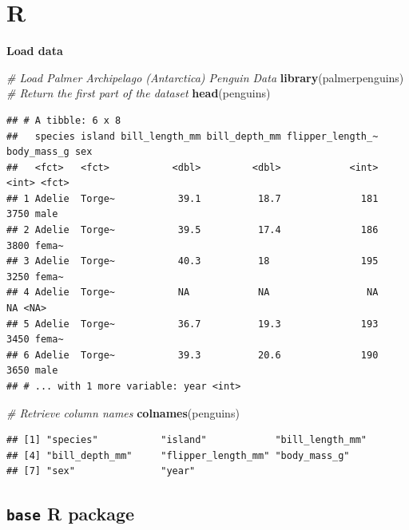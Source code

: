 \documentclass[]{book}
\newenvironment{Shaded}{\begin{snugshade}}{\end{snugshade}}
\newcommand{\CommentTok}[1]{\textcolor[rgb]{0.56,0.35,0.01}{\textit{#1}}}
\newcommand{\KeywordTok}[1]{\textcolor[rgb]{0.13,0.29,0.53}{\textbf{#1}}}
\newcommand{\NormalTok}[1]{#1}
\begin{document}
\hypertarget{r-4}{%
\section{R}\label{r-4}}

\textbf{Load data}

\begin{Shaded}
\begin{Highlighting}[]
\CommentTok{# Load Palmer Archipelago (Antarctica) Penguin Data}
\KeywordTok{library}\NormalTok{(palmerpenguins)}
\CommentTok{# Return the first part of the dataset}
\KeywordTok{head}\NormalTok{(penguins)}
\end{Highlighting}
\end{Shaded}

\begin{verbatim}
## # A tibble: 6 x 8
##   species island bill_length_mm bill_depth_mm flipper_length_~ body_mass_g sex  
##   <fct>   <fct>           <dbl>         <dbl>            <int>       <int> <fct>
## 1 Adelie  Torge~           39.1          18.7              181        3750 male 
## 2 Adelie  Torge~           39.5          17.4              186        3800 fema~
## 3 Adelie  Torge~           40.3          18                195        3250 fema~
## 4 Adelie  Torge~           NA            NA                 NA          NA <NA> 
## 5 Adelie  Torge~           36.7          19.3              193        3450 fema~
## 6 Adelie  Torge~           39.3          20.6              190        3650 male 
## # ... with 1 more variable: year <int>
\end{verbatim}

\begin{Shaded}
\begin{Highlighting}[]
\CommentTok{# Retrieve column names}
\KeywordTok{colnames}\NormalTok{(penguins)}
\end{Highlighting}
\end{Shaded}

\begin{verbatim}
## [1] "species"           "island"            "bill_length_mm"   
## [4] "bill_depth_mm"     "flipper_length_mm" "body_mass_g"      
## [7] "sex"               "year"
\end{verbatim}

\hypertarget{base-r-package}{%
\subsection{\texorpdfstring{\texttt{base} R package}{base R package}}\label{base-r-package}}
\end{document}
